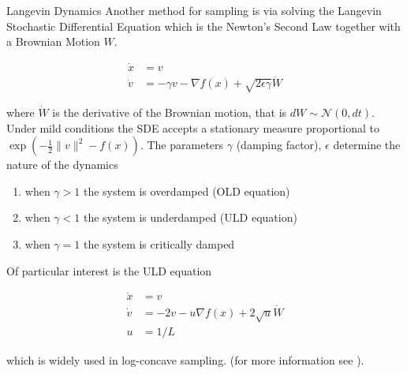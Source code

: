 \documentclass[10pt]{beamer}
\begin{document}
\begin{frame}[allowframebreaks]{Langevin Dynamics}
    Another method for sampling is via solving the Langevin Stochastic Differential Equation which is the Newton's Second Law together with a Brownian Motion $W$. 
    
    \begin{align*}
        \dot x &= v \\
        \dot v &= - \gamma v - \nabla f(x) + \sqrt {2 \epsilon \gamma} \dot W
    \end{align*}
   
    where $\dot W$ is the derivative of the Brownian motion, that is $d W \sim \mathcal N(0, dt)$. Under mild conditions the SDE accepts a stationary measure proportional to $\exp \left ( - \frac 1 2 \| v \|^2  - f(x) \right )$. The parameters $\gamma$ (damping factor), $\epsilon$ determine the nature of the dynamics
    
    \begin{enumerate}
        \item when $\gamma > 1$ the system is overdamped (OLD equation)
        \item when $\gamma < 1$ the system is underdamped (ULD equation)
        \item when $\gamma = 1$ the system is critically damped
    \end{enumerate}

    \framebreak
    
    Of particular interest is the ULD equation
    
    \begin{align*}
        \dot x & = v \\
        \dot v & = -2v - u \nabla f(x) + 2 \sqrt u \dot W \\
        u & = 1 / L
    \end{align*}
    
    which is widely used in log-concave sampling. (for more information see \cite{lee2020logsmooth, lee2018algorithmic, gryazina2014random}). 
    
\end{frame}
\end{document}
